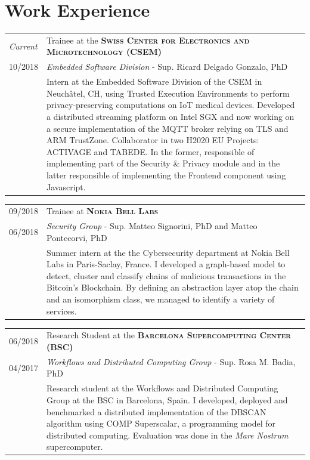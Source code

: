 \documentclass[a4paper,10pt]{article} %
\begin{document}
\section{Work Experience}
%
\begin{tabular}{R{1.5cm}|p{13.8cm}}
    \emph{Current} & Trainee at the \textbf{\textsc{Swiss Center for Electronics and Microtechnology} (CSEM)} \\
    \textsc{10/2018} & \small{\emph{Embedded Software Division} - Sup. Ricard Delgado Gonzalo, PhD }\\ 
    & \footnotesize{Intern at the Embedded Software Division of the CSEM in Neuch\^atel, CH, using Trusted Execution Environments to perform privacy-preserving computations on IoT medical devices. Developed a distributed streaming platform on Intel SGX and now working on a secure implementation of the MQTT broker relying on TLS and ARM TrustZone. Collaborator in two H2020 EU Projects: ACTIVAGE and TABEDE. In the former, responsible of implementing part of the Security \& Privacy module and in the latter responsible of implementing the Frontend component using Javascript.}
\end{tabular}

\begin{tabular}{R{1.5cm}|p{13.8cm}}
    \textsc{09/2018} & Trainee at \textbf{\textsc{Nokia Bell Labs}} \\
    \textsc{06/2018} & \small{\emph{Security Group} - Sup. Matteo Signorini, PhD and Matteo Pontecorvi, PhD}\\ 
& \footnotesize{Summer intern at the the Cybersecurity department at Nokia Bell Labs in Paris-Saclay, France. I developed a graph-based model to detect, cluster and classify chains of malicious transactions in the Bitcoin's Blockchain. By defining an abstraction layer atop the chain and an isomorphism class, we managed to identify a variety of services.}
\end{tabular}

\begin{tabular}{R{1.5cm}|p{13.8cm}}
    \textsc{06/2018} & Research Student at the \textbf{\textsc{Barcelona Supercomputing Center} (BSC)} \\
    \textsc{04/2017} & \small{\emph{Workflows and Distributed Computing Group} - Sup. Rosa M. Badia, PhD} \\ 
    & \footnotesize{Research student at the Workflows and Distributed Computing Group at the BSC in Barcelona, Spain. I developed, deployed and benchmarked a distributed implementation of the DBSCAN algorithm using COMP Superscalar, a programming model for distributed computing. Evaluation was done in the \textit{Mare Nostrum} supercomputer.}
\end{tabular}
\end{document}

